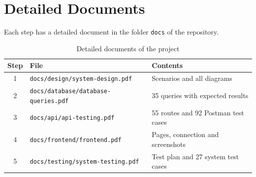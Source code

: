 \documentclass[11pt,a4paper]{article}
\newcommand{\code}[1]{\texttt{#1}}
\begin{document}
\appendix
\section{Detailed Documents}\label{app:documents}
Each step has a detailed document in the folder \code{docs} of the repository.
\begin{table}[H]
\centering
\begin{tabularx}{\textwidth}{@{}clY@{}}
\toprule
\textbf{Step} & \textbf{File} & \textbf{Contents} \\
 & \code{docs/design/system-design.pdf} & Scenarios and all diagrams \\
2 & \code{docs/database/database-queries.pdf} & 35 queries with expected results \\
3 & \code{docs/api/api-testing.pdf} & 55 routes and 92 Postman test cases \\
4 & \code{docs/frontend/frontend.pdf} & Pages, connection and screenshots \\
5 & \code{docs/testing/system-testing.pdf} & Test plan and 27 system test cases \\
\bottomrule
\end{tabularx}
\caption{Detailed documents of the project}
\end{table}
\end{document}
